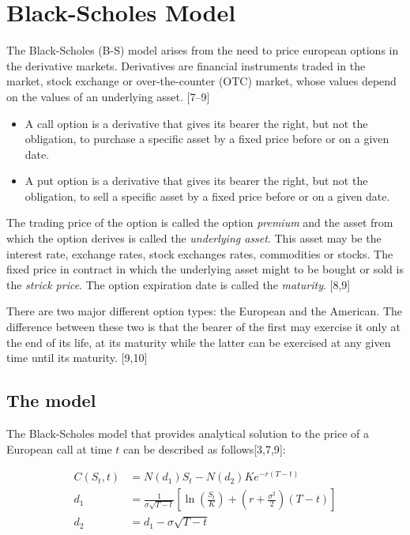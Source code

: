 \documentclass[12pt,twoside]{reedthesis}
\theoremstyle{definition}
\theoremstyle{definition}
\theoremstyle{remark}
\begin{document}
  \section{Black-Scholes Model}\label{black-scholes-model}
  
  The Black-Scholes (B-S) model arises from the need to price european
  options in the derivative markets. Derivatives are financial instruments
  traded in the market, stock exchange or over-the-counter (OTC) market,
  whose values depend on the values of an underlying asset. {[}7--9{]}
  
  \begin{itemize}
  \item
    A call option is a derivative that gives its bearer the right, but not
    the obligation, to purchase a specific asset by a fixed price before
    or on a given date.
  \item
    A put option is a derivative that gives its bearer the right, but not
    the obligation, to sell a specific asset by a fixed price before or on
    a given date.
  \end{itemize}
  
  The trading price of the option is called the option \emph{premium} and
  the asset from which the option derives is called the \emph{underlying
  asset}. This asset may be the interest rate, exchange rates, stock
  exchanges rates, commodities or stocks. The fixed price in contract in
  which the underlying asset might to be bought or sold is the
  \emph{strick price}. The option expiration date is called the
  \emph{maturity}. {[}8,9{]}
  
  There are two major different option types: the European and the
  American. The difference between these two is that the bearer of the
  first may exercise it only at the end of its life, at its maturity while
  the latter can be exercised at any given time until its maturity.
  {[}9,10{]}
  
  \subsection{The model}\label{the-model}
  
  The Black-Scholes model that provides analytical solution to the price
  of a European call at time \(t\) can be described as follows{[}3,7,9{]}:
  
  \begin{align}
  C(S_{t},t)&=N(d_{1})S_{t}-N(d_{2})Ke^{-r(T-t)}\\[10pt]
  d_{1}&={\frac {1}{\sigma {\sqrt {T-t}}}}\left[\ln \left({\frac {S_{t}}{K}}\right)+\left(r+{\frac {\sigma ^{2}}{2}}\right)(T-t)\right]\\[10pt]
  d_{2}&=d_{1}-\sigma {\sqrt {T-t}}
  \end{align}
  
\end{document}

